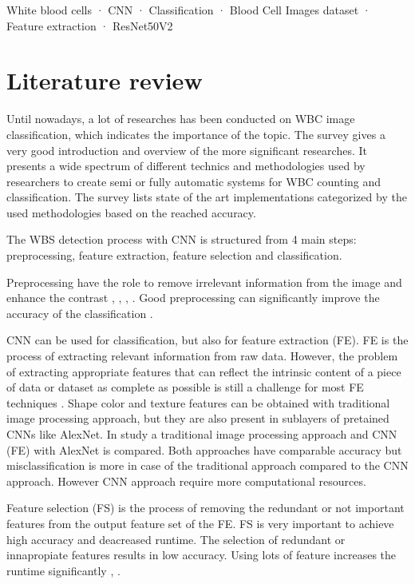 \documentclass[conference]{IEEEtran}
\begin{document}
\begin{IEEEkeywords}
White blood cells · CNN · Classification · Blood Cell Images dataset · Feature extraction · ResNet50V2
\end{IEEEkeywords}



\section{Literature review}
Until nowadays, a lot of researches has been conducted on WBC image classification, which indicates the importance of the topic.
The \cite{b7} survey gives a very good introduction and overview of the more significant researches. It presents a wide spectrum of different technics and methodologies used by researchers to create semi or fully automatic systems for WBC counting and classification. The survey lists state of the art implementations categorized by the used methodologies based on the reached accuracy.

The WBS detection process with CNN is structured from 4 main steps: preprocessing, feature extraction, feature selection and classification.

Preprocessing have the role to remove irrelevant information from the image and enhance the contrast \cite{b8}, \cite{b9}, \cite{b10}, \cite{b11}. Good preprocessing can significantly improve the accuracy of the classification \cite{b12}.

CNN can be used for classification, but also for feature extraction (FE). FE is the process of extracting relevant information from raw data. However, 
the problem of extracting appropriate features that can reflect the intrinsic content of a piece of data or dataset as complete as possible is still a challenge for most FE techniques \cite{b13}. 
Shape color and texture features can be obtained with traditional image processing approach, but they are also present in sublayers of pretained CNNs like AlexNet.
In \cite{b14} study a traditional image processing approach and CNN (FE) with AlexNet is compared. Both approaches have comparable accuracy but misclassification is 
more in case of the traditional approach compared to the CNN approach. However CNN approach require more computational resources.

Feature selection (FS) is the process of removing the redundant or not important features from the output feature set of the FE. FS is very important to achieve high accuracy and deacreased runtime. 
The selection of redundant or innapropiate features results in low accuracy. Using lots of feature increases the runtime significantly \cite{b15}, \cite{b16}.
\end{document}
